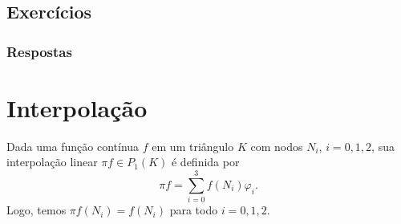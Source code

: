 \subsection{Exercícios}
\badgeConstrucao

\subsubsection{Respostas}

\shipoutAnswer

\section{Interpolação}\label{cap_mef2d_sec_interp}
\badgeRevisar

Dada uma função contínua $f$ em um triângulo $K$ com nodos $N_i$, $i=0, 1, 2$, sua interpolação linear $\pi f \in P_1(K)$ é definida por
\begin{equation}
  \pi f = \sum_{i=0}^3 f(N_i)\varphi_i.
\end{equation}
Logo, temos $\pi f(N_i) = f(N_i)$ para todo $i=0, 1, 2$.

